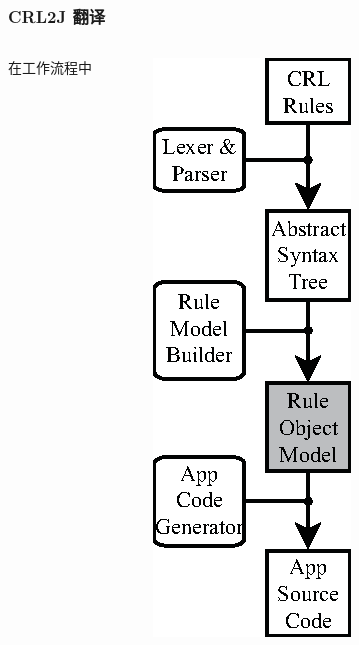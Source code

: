 \documentclass[10pt]{beamer}
\begin{document}
\begin{frame}

\frametitle{CRL2J 翻译}

\begin{columns}
\small{\centerline{在工作流程中}}

\begin{figure}
\includegraphics[width=0.65\linewidth]{rom_in_wf.eps}
\end{figure}


\end{columns}
\end{frame}
\end{document}
